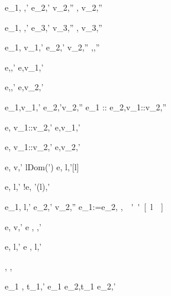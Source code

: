   { {e_1,{\sigma}{\eval} \True,{\sigma}'}\Quad
   {e_2,{\sigma}'{\eval} {v_2},{\sigma}''}}
  {,{\sigma}{\eval} {v_2},{\sigma}''}
  {}

  { {e_1,{\sigma}{\eval} \False ,{\sigma}'}\Quad
   {e_3,{\sigma}'{\eval} {v_3},{\sigma}''}}
  {,{\sigma}{\eval} {v_3},{\sigma}''}
  {}


  {e_1,{\sigma}{\eval} {v_1},{\sigma}' \Quad
   e_2,{\sigma}'{\eval} {v_2},{\sigma}''}
  {,{\sigma}{\eval},{\sigma}''}
  {}

  {e,\sigma\eval {},\sigma'}
  {\Fst e,\sigma\eval v_1,\sigma'}
  {}

  {e,\sigma\eval{},\sigma'}
  {\Snd e,\sigma \eval v_2,\sigma' }
  {}


  {e_1,{\sigma}{\eval}{v_1},{\sigma}'\Quad
   e_2,{\sigma}'{\eval}{v_2},{\sigma}''}
  {e_1 :: e_2,{\sigma}{\eval}{v_1}::{v_2},{\sigma}''}
  {}

  {e,{\sigma}{\eval} {v_1}::{v_2},{\sigma}'}
  {\Head e,{\sigma}{\eval}{v_1},{\sigma}'}
  {}

  {e,{\sigma}{\eval} {v_1}::{v_2},{\sigma}'}
  {\Tail e,{\sigma}{\eval}{v_2},{\sigma}'}
  {}



  {e,{\sigma}{\eval} {v},{\sigma}' \Quad
   l\not\in Dom({\sigma}')}
  {\Ref e,{\sigma}{\eval} l,{\sigma}'[l]}
  {}

  {e,{\sigma}{\eval} l,{\sigma}'}
  {!e,{\sigma}{\eval} {\sigma}'(l),{\sigma}'}
  {}

  {e_1,{\sigma}{\eval} l,{\sigma}' \Quad
   e_2,{\sigma}'{\eval} {v_2},{\sigma}''}
  {e_1:=e_2,{\sigma}{\eval} \unit,{\sigma}''[l]}
  {}

  {e,{\sigma} {\eval} {v},{\sigma}'}
  {\Edit e , {\sigma}{\eval} ,{\sigma}'}
  {}

  {e,{\sigma}{\eval} l,{\sigma}'}
  {\Update e ,{\sigma}{\eval} \Update l,{\sigma}'}
  {}


  {}
  {\Fail,{\sigma} {\eval} \Fail,{\sigma}}
  {}


  {e_1 ,{\sigma}{\eval} {t_1},{\sigma}'}
  {e_1 \Then e_2,{\sigma}{\eval}{t_1} \Then e_2,{\sigma}'}
  {}


